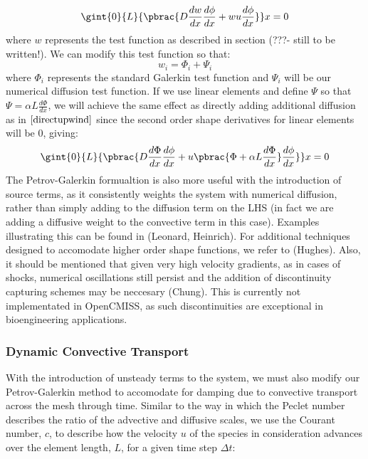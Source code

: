 \begin{equation}
 \gint{0}{L}{\pbrac{D\frac{dw}{dx}\frac{{d}\phi}{dx}+wu\frac{{d}\phi}{dx}}}x=0
\end{equation}
where $w$ represents the test function as described in section (???- still to be written!). We can modify this test function so that:
\begin{equation}
 w_i = \Phi_i + \Psi_i
\end{equation}
where $\Phi_i$ represents the standard Galerkin test function and $\Psi_i$ will be our numerical diffusion test function. If we use linear elements and define $\Psi$ so that $\Psi={\alpha}L\frac{d\Phi}{dx}$, we will achieve the same effect as directly adding additional diffusion as in $\eqref{directupwind}$ since the second order shape derivatives for linear elements will be 0, giving:
\begin{equation}
 \gint{0}{L}{\pbrac{D\frac{d\Phi}{dx}\frac{{d}\phi}{dx}+{u}\pbrac{\Phi+{\alpha}L\frac{d\Phi}{dx}}\frac{{d}\phi}{dx}}}x=0
\end{equation}
The Petrov-Galerkin formualtion is also more useful with the introduction of source terms, as it consistently weights the system with numerical diffusion, rather than simply adding to the diffusion term on the LHS (in fact we are adding a diffusive weight to the convective term in this case). Examples illustrating this can be found in (Leonard, Heinrich). For additional techniques designed to accomodate higher order shape functions, we refer to (Hughes). Also, it should be mentioned that given very high velocity gradients, as in cases of shocks, numerical oscillations still persist and the addition of discontinuity capturing schemes may be neccesary (Chung). This is currently not implementated in OpenCMISS, as such discontinuities are exceptional in bioengineering applications.

\subsubsection{Dynamic Convective Transport}

With the introduction of unsteady terms to the system, we must also modify our Petrov-Galerkin method to accomodate for damping due to convective transport across the mesh through time. Similar to the way in which the Peclet number describes the ratio of the advective and diffusive scales, we use the Courant number, $c$, to describe how the velocity $u$ of the species in consideration advances over the element length, $L$, for a given time step $\Delta{t}$:

